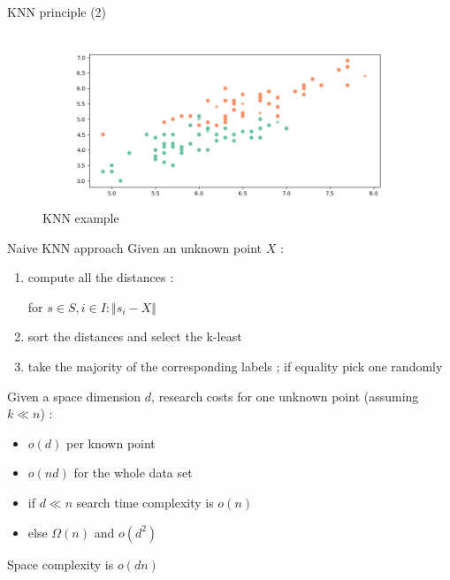 \documentclass[11 pt]{beamer}
\begin{document}

\begin{frame}{KNN principle (2)}
\begin{figure}
	\centering
	\includegraphics[width=\textwidth]{figures/irisClass2_1.png}
	\caption{KNN example}
	\label{fig:iris2}
\end{figure}
\end{frame}
%

\begin{frame}{Naive KNN approach}
Given an unknown point $X$ :
\begin{enumerate}
	\item compute all the distances :

	for $s \in S, i \in I :\Vert s_i - X\Vert$

	\item sort the distances and select the k-least

	\item take the majority of the corresponding labels ; if equality pick one randomly
\end{enumerate}

Given a space dimension $d$, research costs for one unknown point (assuming $k \ll n$) :

\begin{itemize}
	\item $o(d)$ per known point
	\item $o(nd)$ for the whole data set
\end{itemize}

\begin{itemize}
	\item if $d \ll n$ search time complexity is $o(n)$
	\item else $\Omega(n)$ and $o(d^2)$
\end{itemize}

Space complexity is $o(dn)$
\end{frame}
%
\end{document}
